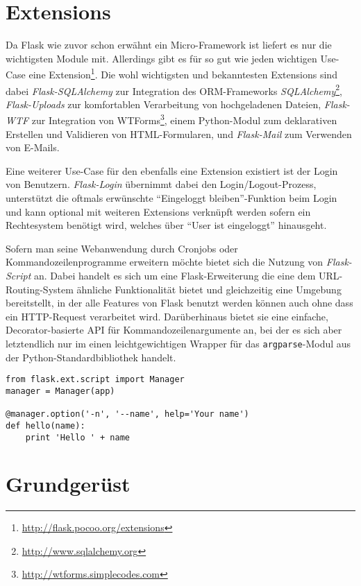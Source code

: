 \section{Extensions}

Da Flask wie zuvor schon erwähnt ein Micro-Framework ist liefert es nur die wichtigsten Module mit.
Allerdings gibt es für so gut wie jeden wichtigen Use-Case eine
Extension\footnote{\href{http://flask.pocoo.org/extensions}{http://flask.pocoo.org/extensions}}. Die
wohl wichtigsten und bekanntesten Extensions sind dabei \emph{Flask-SQLAlchemy} zur Integration des
ORM-Frameworks
\emph{SQLAlchemy}\footnote{\href{http://www.sqlalchemy.org}{http://www.sqlalchemy.org}},
\emph{Flask-Uploads} zur komfortablen Verarbeitung von hochgeladenen Dateien, \emph{Flask-WTF} zur
Integration von
WTForms\footnote{\href{http://wtforms.simplecodes.com}{http://wtforms.simplecodes.com}}, einem
Python-Modul zum deklarativen Erstellen und Validieren von HTML-Formularen, und \emph{Flask-Mail}
zum Verwenden von E-Mails.

Eine weiterer Use-Case für den ebenfalls eine Extension existiert ist der Login von Benutzern.
\emph{Flask-Login} übernimmt dabei den Login/Logout-Prozess, unterstützt die oftmals erwünschte
\enquote{Eingeloggt bleiben}-Funktion beim Login und kann optional mit weiteren Extensions verknüpft
werden sofern ein Rechtesystem benötigt wird, welches über \enquote{User ist eingeloggt} hinausgeht.

Sofern man seine Webanwendung durch Cronjobs oder Kommandozeilenprogramme erweitern möchte bietet
sich die Nutzung von \emph{Flask-Script} an. Dabei handelt es sich um eine Flask-Erweiterung die
eine dem URL-Routing-System ähnliche Funktionalität bietet und gleichzeitig eine Umgebung
bereitstellt, in der alle Features von Flask benutzt werden können auch ohne dass ein HTTP-Request
verarbeitet wird. Darüberhinaus bietet sie eine einfache, Decorator-basierte API für
Kommandozeilenargumente an, bei der es sich aber letztendlich nur im einen leichtgewichtigen Wrapper
für das \lstinline{argparse}-Modul aus der Python-Standardbibliothek handelt.

\begin{lstlisting}[caption=Flask-Script]
from flask.ext.script import Manager
manager = Manager(app)

@manager.option('-n', '--name', help='Your name')
def hello(name):
    print 'Hello ' + name
\end{lstlisting}

\section{Grundgerüst}

